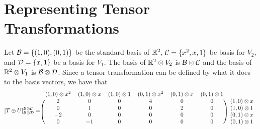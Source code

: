 \section{Representing Tensor Transformations}

Let $\mathcal{B} = \{(1,0), (0,1)\}$ be the standard basis of $\mathbb{R}^2$,
$\mathcal{C} = \{x^2, x, 1\}$ be basis for $V_2$,
and $\mathcal{D} = \{x, 1\}$ be a basis for $V_1$.
The basis of $\mathbb{R}^2 \otimes V_2 $ is $\mathcal{B} \otimes \mathcal{C}$
and the basis of $\mathbb{R}^2 \otimes V_1$ is $\mathcal{B} \otimes \mathcal{D}$.
Since a tensor transformation can be defined by what 
it does to the basis vectors, we have that
\[
[T \oplus U]^{\basisb \otimes \basisc}_{\basisb \otimes \basisd} =
\begin{blockarray}{ccccccc}
(1,0) \otimes x^2 & (1,0) \otimes x & (1,0) \otimes 1 & (0,1) \otimes x^2 & (0,1) \otimes x & (0,1) \otimes 1 \\
\begin{block}{(cccccc)c}
   2 &  0 & 0 & 4 & 0 & 0 & (1,0) \otimes x \\
   0 &  1 & 0 & 0 & 2 & 0 & (1,0) \otimes 1 \\
  -2 &  0 & 0 & 0 & 0 & 0 & (0,1) \otimes x \\
   0 & -1 & 0 & 0 & 0 & 0 & (0,1) \otimes 1 \\
\end{block}
\end{blockarray}
 \]